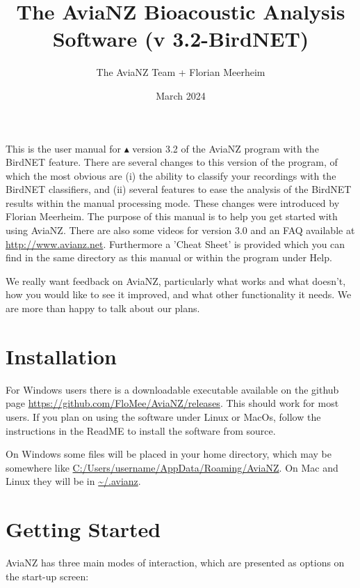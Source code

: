 \documentclass{scrartcl}
\title{The AviaNZ Bioacoustic Analysis Software (v 3.2-BirdNET)}
\author{The AviaNZ Team + Florian Meerheim}%
\date{March 2024}
\begin{document}
\maketitle

This is the user manual for $\blacktriangle$ version 3.2 of the AviaNZ program with the BirdNET feature.
There are several changes to this version of the program, of which the most obvious are (i) the ability to classify your recordings with the BirdNET classifiers, and (ii) several features to ease the analysis of the BirdNET results within the manual processing mode. 
These changes were introduced by Florian Meerheim.
The purpose of this manual is to help you get started with using AviaNZ.
There are also some videos for version 3.0 and an FAQ available at \url{http://www.avianz.net}.
Furthermore a 'Cheat Sheet' is provided which you can find in the same directory as this manual or within the program under Help.
 
We really want feedback on AviaNZ, particularly what works and what doesn't, how you would like to see it improved, and what other functionality it needs.
We are more than happy to talk about our plans. 

\tableofcontents

\newpage
\section{Installation}

For Windows users there is a downloadable executable available on the github page \url{https://github.com/FloMee/AviaNZ/releases}.
This should work for most users.
If you plan on using the software under Linux or MacOs, follow the instructions in the ReadME to install the software from source.

On Windows some files will be placed in your home directory, which may be somewhere like \url{C:/Users/username/AppData/Roaming/AviaNZ}. On Mac and Linux they will be in \url{~/.avianz}. 

\section{Getting Started}

AviaNZ has three main modes of interaction, which are presented as options on the start-up screen:
\end{document}
